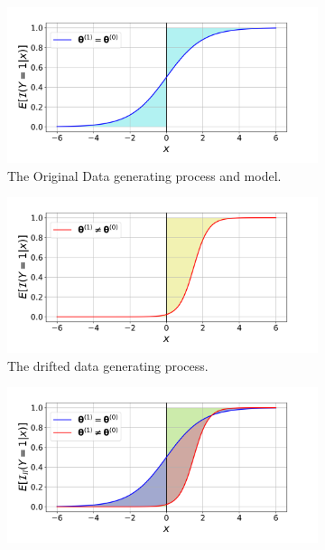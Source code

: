 \documentclass[twoside,11pt]{article}
\begin{document}
\begin{figure}[!htbp]
\centering
 \begin{subfigure}[t]{0.4\linewidth}
         \centering
         \includegraphics[width=\textwidth, trim=.2in .2in .7in .45in, clip]{../figures/v14/demons_fig/2D_logi_orig.png}
         \caption{The Original Data generating process and model.}
         \label{fig:logi_err_rate_unch_a}
  \end{subfigure}
  \begin{subfigure}[t]{0.4\linewidth}
         \centering
         \includegraphics[width=\textwidth, trim=.2in .2in .7in .45in, clip]{../figures/v14/demons_fig/2D_logi_cd.png}
         \caption{The drifted data generating process.}
         \label{fig:logi_err_rate_unch_b}
  \end{subfigure}
 \begin{subfigure}[t]{0.5\linewidth}
         \centering
	 \includegraphics[width = \textwidth, trim=.2in .2in .7in .45in, clip]{../figures/v14/demons_fig/2D_logi.png}

\end{subfigure}
\end{figure}
\end{document}
